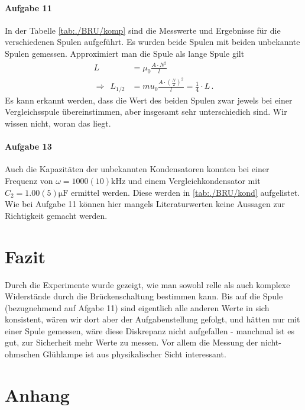 \documentclass[11pt, a4paper]{article}
\begin{document}
    \paragraph{Aufgabe 11}
    In der Tabelle \ref{tab:./BRU/komp} sind die Messwerte und Ergebnisse für die verschiedenen Spulen aufgeführt. Es wurden beide Spulen mit beiden unbekannte Spulen gemessen. Approximiert man die Spule als lange Spule gilt
    \begin{align}
        L &= \mu_0 \frac{A\cdot N^2}{l} \\
        \Rightarrow \ \ L_{1/2} &= mu_0 \frac{A\cdot \left(\frac{N}{2}\right)^2}{l} = \frac{1}{4} \cdot L \,. \label{lspu}
    \end{align}
    Es kann erkannt werden, dass die Wert des beiden Spulen zwar jewels bei einer Vergleichsspule übereinstimmen, aber insgesamt sehr unterschiedich sind. Wir wissen nicht, woran das liegt.

    

    \paragraph{Aufgabe 13}
    Auch die Kapazitäten der unbekannten Kondensatoren konnten bei einer Frequenz von $\omega = 1000(10) \si{\kilo\hertz}$ und einem Vergleichkondensator mit $C_2 = 1.00(5) \si{\micro\farad}$ ermittel werden. Diese werden in \ref{tab:./BRU/kond} aufgelistet. Wie bei Aufgabe 11 können hier mangels Literaturwerten keine Aussagen zur Richtigkeit gemacht werden.
    
    

    \section{Fazit}
    Durch die Experimente wurde gezeigt, wie man sowohl relle als auch komplexe Widerstände durch die Brückenschaltung bestimmen kann. Bis auf die Spule (bezugnehmend auf Afgabe 11) sind eigentlich alle anderen Werte in sich konsistent, wären wir dort aber der Aufgabenstellung gefolgt, und hätten nur mit einer Spule gemessen, wäre diese Diskrepanz nicht aufgefallen - manchmal ist es gut, zur Sicherheit mehr Werte zu messen. Vor allem die Messung der nicht-ohmschen Glühlampe ist aus physikalischer Sicht interessant.

    \section{Anhang}
\end{document}
